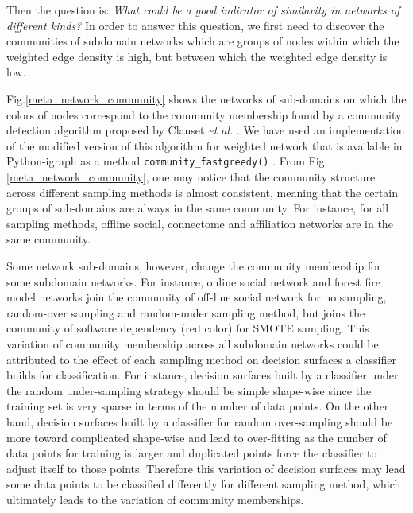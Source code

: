 Then the question is: \textit{What could be a good indicator of similarity in networks of different kinds?} In order to answer this question, we first need to discover the communities of subdomain networks which are groups of nodes within which the weighted edge density is high, but between which the weighted edge density is low.

Fig.\ref{meta_network_community} shows the networks of sub-domains on which the colors of nodes correspond to the community membership found by a community detection algorithm proposed by Clauset \textit{et al.} \cite{CNMAlgorithm}. We have used an implementation of the modified version of this algorithm for weighted network that is available in Python-igraph as a method \texttt{community\_fastgreedy()} \cite{igraph}. From Fig.\ref{meta_network_community}, one may notice that the community structure across different sampling methods is almost consistent, meaning that the certain groups of sub-domains are always in the same community.  For instance, for all sampling methods, offline social, connectome and affiliation networks are in the same community. 

Some network sub-domains, however, change the community membership for some subdomain networks. For instance, online social network and forest fire model networks join the community of off-line social network for no sampling, random-over sampling and random-under sampling method, but joins the community of software dependency (red color) for SMOTE sampling. This variation of community membership across all subdomain networks could be attributed to the effect of each sampling method on decision surfaces a classifier builds for classification. For instance, decision surfaces built by a classifier under the random under-sampling strategy should be simple shape-wise since the training set is very sparse in terms of the number of data points. On the other hand, decision surfaces built by a classifier for random over-sampling should be more toward complicated shape-wise and lead to over-fitting as the number of data points for training is larger and duplicated points force the classifier to adjust itself to those points. Therefore this variation of decision surfaces may lead some data points to be classified differently for different sampling method, which ultimately leads to the variation of community memberships.


